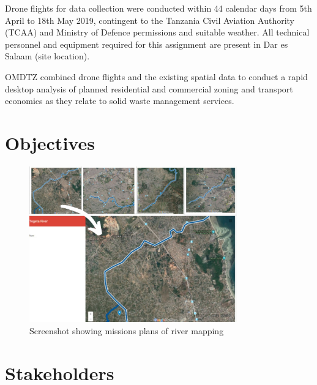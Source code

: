 \documentclass[a4paper,12pt,twoside]{article}
\begin{document}
Drone flights for data collection were conducted within 44 calendar days from 5th April to 18th May 2019, contingent  to the Tanzania Civil Aviation Authority (TCAA) and Ministry of Defence permissions and suitable weather. All technical personnel and equipment required for this assignment are present in Dar es Salaam (site location). 

OMDTZ  combined drone flights and the existing spatial data to conduct a rapid desktop analysis of planned residential and commercial zoning and transport economics as they relate to solid waste management services.

\newpage
\section{Objectives}

\lipsum[0-1]


\begin{figure}%
    \centering
    \includegraphics[width=0.8\textwidth]{images/image14.jpg}
    \caption{Screenshot showing missions plans of river mapping}
\end{figure}


\begin{multicols}{2}
\lipsum[0-5]
\end{multicols}

\section{Stakeholders}

\begin{multicols}{2}
\lipsum[0-5]
\end{multicols}
\end{document}
